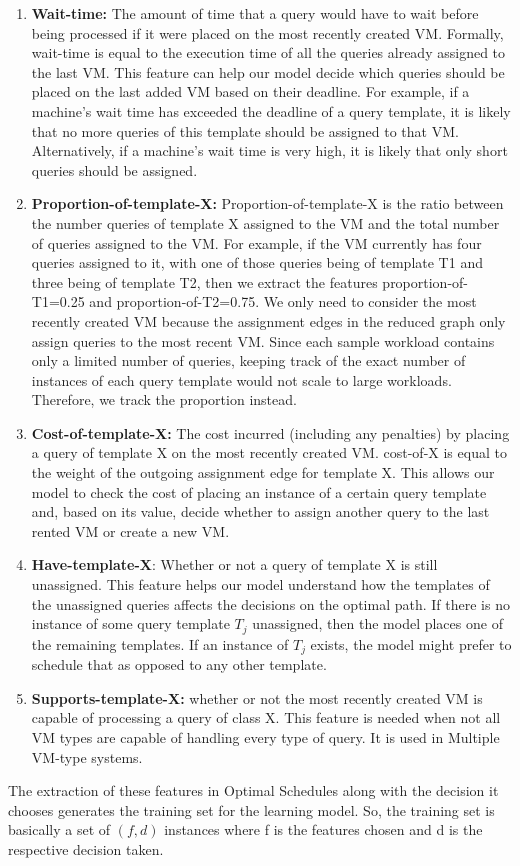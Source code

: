 \begin{enumerate}
\item \textbf{Wait-time:} The amount of time that a query would have to wait before being processed if it were placed on the most recently created VM. Formally, wait-time is equal to the execution time of all the queries already assigned to the last VM. This feature can help our model decide which queries should be placed on the last added VM based on their deadline. For example, if a machine’s wait time has exceeded the deadline of a query template, it is likely that no more queries of this template should be assigned to that VM. Alternatively, if a machine’s wait time is very high, it is likely that only short queries should be assigned.
\item \textbf{Proportion-of-template-X:} Proportion-of-template-X is the ratio between the number queries of template X assigned to the VM and the total number of queries assigned to the VM. For example, if the VM currently has four queries assigned to it, with one of those queries being of template T1 and three being of template T2, then we extract the features proportion-of-T1=0.25 and proportion-of-T2=0.75. We only need to consider the most recently created VM because the assignment edges in the reduced graph only assign queries to the most recent VM. Since each sample workload contains only a limited number of queries, keeping track of the exact number of instances of each query template would not scale to large workloads. Therefore, we track the proportion instead.
\item \textbf{Cost-of-template-X:} The cost incurred (including any penalties) by placing a query of template X on the most recently created VM. cost-of-X is equal to the weight of the outgoing assignment edge for template X. This allows our model to check the cost of placing an instance of a certain query template and, based on its value, decide whether to assign another query to the last rented VM or create a new VM.
\item \textbf{Have-template-X}: Whether or not a query of template X is still unassigned. This feature helps our model understand how the templates of the unassigned queries affects the decisions on the optimal path. If there is no instance of some query template \(T_j\) unassigned, then the model places one of the remaining templates. If an instance of \(T_j\) exists, the model might prefer to schedule that as opposed to any other template.

\item \textbf{Supports-template-X:} whether or not the most recently created VM is capable of processing a query of class X. This feature is needed when not all VM types are capable of handling every type of query. It is used in Multiple VM-type systems.
\end {enumerate}
The extraction of these features in Optimal Schedules along with the decision it chooses generates the training set for the learning model. So, the training set is basically a set of \((f,d)\) instances where f is the features chosen and d is the respective decision taken.

